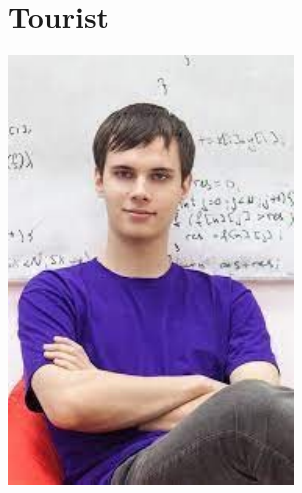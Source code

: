 \section{Tourist}
\begin{minipage}{90mm}
\includegraphics[width=\textwidth]{content/various/tourist}
\end{minipage}

